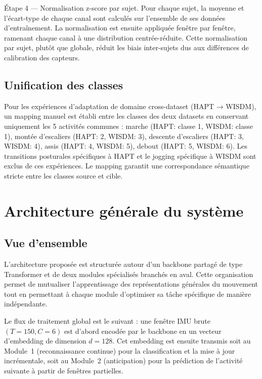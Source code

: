 Étape 4 — Normalisation z-score par sujet. Pour chaque sujet, la moyenne et l'écart-type de chaque canal sont calculés sur l'ensemble de ses données d'entraînement. La normalisation est ensuite appliquée fenêtre par fenêtre, ramenant chaque canal à une distribution centrée-réduite. Cette normalisation par sujet, plutôt que globale, réduit les biais inter-sujets dus aux différences de calibration des capteurs.

\subsection{Unification des classes}

Pour les expériences d'adaptation de domaine cross-dataset (HAPT → WISDM), un mapping manuel est établi entre les classes des deux datasets en conservant uniquement les 5 activités communes : marche (HAPT: classe 1, WISDM: classe 1), montée d'escaliers (HAPT: 2, WISDM: 3), descente d'escaliers (HAPT: 3, WISDM: 4), assis (HAPT: 4, WISDM: 5), debout (HAPT: 5, WISDM: 6). Les transitions posturales spécifiques à HAPT et le jogging spécifique à WISDM sont exclus de ces expériences. Le mapping garantit une correspondance sémantique stricte entre les classes source et cible.

\section{Architecture générale du système}

\subsection{Vue d'ensemble}

L'architecture proposée est structurée autour d'un backbone partagé de type Transformer et de deux modules spécialisés branchés en aval. Cette organisation permet de mutualiser l'apprentissage des représentations générales du mouvement tout en permettant à chaque module d'optimiser sa tâche spécifique de manière indépendante.

Le flux de traitement global est le suivant : une fenêtre IMU brute $(T=150, C=6)$ est d'abord encodée par le backbone en un vecteur d'embedding de dimension $d=128$. Cet embedding est ensuite transmis soit au Module~1 (reconnaissance continue) pour la classification et la mise à jour incrémentale, soit au Module~2 (anticipation) pour la prédiction de l'activité suivante à partir de fenêtres partielles.



